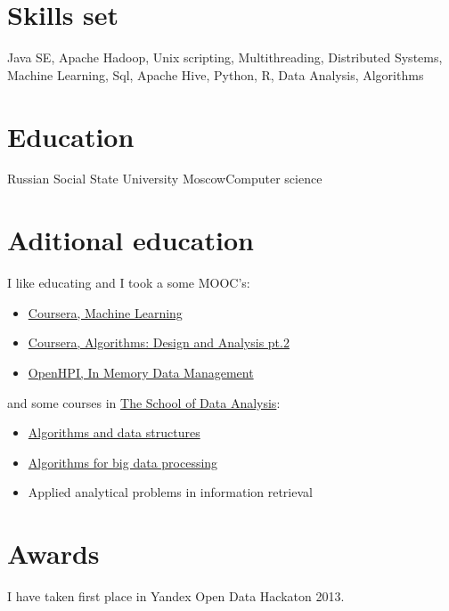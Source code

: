 \documentclass[xetex]{moderncv}
\begin{document}
\section{Skills set}
Java SE, Apache Hadoop, Unix scripting, Multithreading, Distributed Systems, Machine Learning, Sql, Apache Hive, Python, R, Data Analysis, Algorithms

\pagebreak

\section{Education}
 {Russian Social State University} {Moscow}{}{Computer science}

\section {Aditional education}

I like educating and I took a some MOOC's:  
\begin{itemize}
\item \href{https://www.dropbox.com/s/ey4kpuspil6ez54/Statement\%20of\%20Accomplishment.pdf}{Coursera, Machine Learning }
\item \href{https://www.dropbox.com/s/ot8hvdck28tyoj4/AlgoDA2.pdf}{Coursera,  Algorithms: Design and Analysis pt.2 }
\item \href{https://www.dropbox.com/s/ikqocsfb94sot51/in_memory_data_management_certificate_full_15656.pdf}{OpenHPI, In Memory Data Management }
\end{itemize}
and some courses in \href{http://shad.yandex.ru/?ncrnd=6964}{The School of Data Analysis}:
\begin{itemize}
\item \href{http://shad.yandex.ru/program/algorithms1.xml}{ Algorithms and data structures}
\item \href{http://shad.yandex.ru/program/algorithms3.xml}{ Algorithms for big data processing}
\item Applied analytical problems in information retrieval
\end{itemize} 
\section {Awards}
I have taken first place in Yandex Open Data Hackaton 2013.
\end{document}
